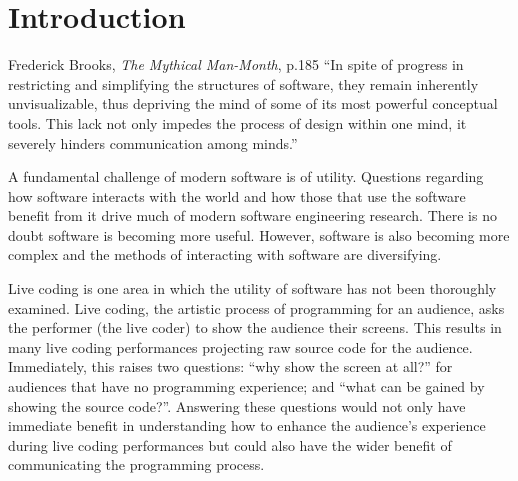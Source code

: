
\chapter{Introduction}
\label{chap:introduction}

\begin{chapquote}{Frederick Brooks, \textit{The Mythical Man-Month}, p.185}
``In spite of progress in restricting and simplifying the structures of software, they remain inherently unvisualizable, thus depriving the mind of some of its most powerful conceptual tools. This lack not only impedes the process of design within one mind, it severely hinders communication among minds.''
\end{chapquote}


A fundamental challenge of modern software is of utility. Questions regarding how software interacts with the world and how those that use the software benefit from it drive much of modern software engineering research. There is no doubt software is becoming more useful. However, software is also becoming more complex and the methods of interacting with software are diversifying.

Live coding is one area in which the utility of software has not been thoroughly examined. Live coding, the artistic process of programming for an audience, asks the performer (the live coder) to show the audience their screens. This results in many live coding performances projecting raw source code for the audience. Immediately, this raises two questions: ``why show the screen at all?'' for audiences that have no programming experience; and ``what can be gained by showing the source code?''. Answering these questions would not only have immediate benefit in understanding how to enhance the audience's experience during live coding performances but could also have the wider benefit of communicating the programming process.







